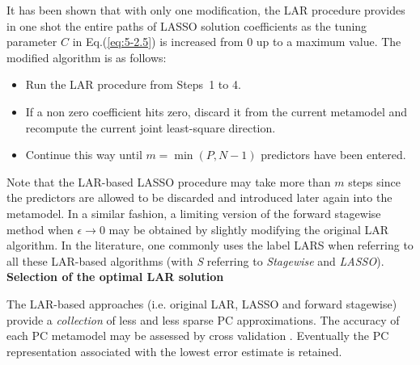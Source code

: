 {It has been shown that with only one modification, the LAR procedure provides in one shot the entire paths of LASSO solution coefficients as the tuning parameter $C$ in Eq.(\ref{eq:5-2.5}) is increased from 0 up to a maximum value. The modified algorithm is as follows:
\begin{itemize}
	\item Run the LAR procedure from Steps~1 to 4.
	\item If a non zero coefficient hits zero, discard it from the current metamodel and recompute the current joint least-square direction.
	\item Continue this way until $m = \min(P,N-1)$ predictors have been entered.
\end{itemize}
Note that the LAR-based LASSO procedure may take more than $m$ steps since the predictors are allowed to be discarded and introduced later again into the metamodel. In a similar fashion, a limiting version of the forward stagewise method when $\epsilon \to 0$ may be obtained by slightly modifying the original LAR algorithm. In the literature, one commonly uses the label LARS when referring to all these LAR-based algorithms (with \emph{S} referring to \emph{Stagewise} and \emph{LASSO}). \\

\textbf{Selection of the optimal LAR solution} \vspace{2mm}

The LAR-based approaches (i.e. original LAR, LASSO and forward stagewise) provide a \emph{collection} of less and less sparse PC approximations. The accuracy of each PC metamodel may be assessed by cross validation . Eventually the PC representation associated with the lowest error estimate is retained.
}


